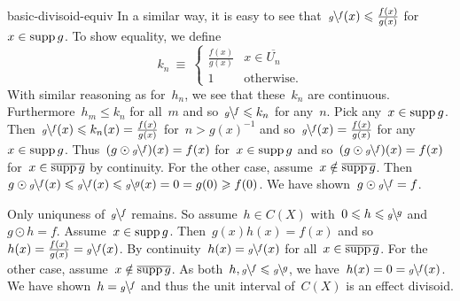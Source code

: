 \begin{solution}{basic-divisoid-equiv}
In a similar way, it is easy to see
    that~$\rfrac{f}{g}(x) \leq \frac{f(x)}{g(x)}$ for~$x \in \operatorname{supp} g$.
    To show equality, we define
\begin{equation*}
    k_n \ \equiv \  \begin{cases}
        \frac{f(x)}{g(x)} & x \in \overline{U_n}\\
        1 & \text{otherwise}.
    \end{cases}
\end{equation*}
With similar reasoning as for~$h_n$,  we see that these~$k_n$ are continuous.
Furthermore~$h_m \leq k_n$ for all~$m$
    and so~$\rfrac{f}{g} \leq k_n$ for any~$n$.
Pick any~$x \in \operatorname{supp} g$.
Then~$\rfrac{f}{g} (x) \leq k_n(x) = \frac{f(x)}{g(x)}$
    for~$n > g(x)^{-1}$
    and so~$\rfrac{f}{g}(x) = \frac{f(x)}{g(x)}$
        for any~$x \in \operatorname{supp} g$.
Thus~$(g \odot \rfrac{f}{g} )(x)= f(x) $ for~$x \in \operatorname{supp} g$
    and so~$(g\odot \rfrac{f}{g})(x) = f(x)$ for~$x \in \overline{\operatorname{supp} g}$
    by continuity.
For the other case, assume~$x \notin \overline{\operatorname{supp} g}$.
Then~$g \odot \rfrac{f}{g} (x) \leq \rfrac{f}{g} (x) \leq \rfrac{g}{g}(x) = 0
    = g(0) \geq f(0)$.
We have shown~$g\odot \rfrac{f}{g} = f$.

Only uniquness of~$\rfrac{f}{g}$ remains.
So assume~$h \in C(X)$
    with~$0 \leq h \leq \rfrac{g}{g}$
    and~$g \odot  h = f$.
Assume~$x \in \operatorname{supp} g$.
Then~$g(x)h(x) = f(x)$ and so~$h(x) = \frac{f(x)}{g(x)} = \rfrac{f}{g}(x)$.
By continuity~$h(x) = \rfrac{f}{g} (x)$ for all~$x \in \overline{\operatorname{supp} g}$.
For the other case, assume~$x \notin \overline{\operatorname{supp} g}$.
As both~$h, \rfrac{f}{g} \leq \rfrac{g}{g}$,
    we have~$h(x) = 0 = \rfrac{f}{g}(x)$.
We have shown~$h = \rfrac{f}{g}$
    and thus the unit interval of~$C(X)$
    is an effect divisoid.
\end{solution}
